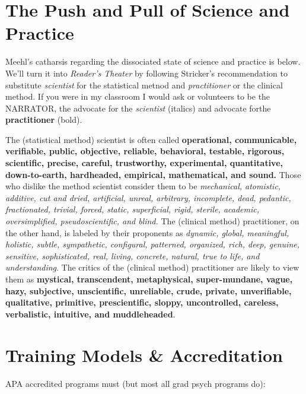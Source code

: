 \documentclass[
  english,
]{book}
\begin{document}
\hypertarget{the-push-and-pull-of-science-and-practice}{%
\section{The Push and Pull of Science and Practice}\label{the-push-and-pull-of-science-and-practice}}

Meehl's \citeyearpar[p.~4]{meehl_clinical_1954} catharsis regarding the dissociated state of science and practice is below. We'll turn it into \emph{Reader's Theater} by following Stricker's \citeyearpar{stricker_are_1997} recommendation to substitute \emph{scientist} for the statistical metnod and \emph{practitioner} or the clinical method. If you were in my classroom I would ask or volunteers to be the NARRATOR, the advocate for the \emph{scientist} (italics) and advocate forthe \textbf{practitioner} (bold).

The (statistical method) scientist is often called \textbf{operational, communicable, verifiable, public, objective, reliable, behavioral, testable, rigorous, scientific, precise, careful, trustworthy, experimental, quantitative, down-to-earth, hardheaded, empirical, mathematical, and sound.} Those who dislike the method scientist consider them to be \emph{mechanical, atomistic, additive, cut and dried, artificial, unreal, arbitrary, incomplete, dead, pedantic, fractionated, trivial, forced, static, superficial, rigid, sterile, academic, oversimplified, pseudoscientific, and blind.} The (clinical method) practitioner, on the other hand, is labeled by their proponents as \emph{dynamic, global, meaningful, holistic, subtle, sympathetic, configural, patterned, organized, rich, deep, genuine, sensitive, sophisticated, real, living, concrete, natural, true to life, and understanding}. The critics of the (clinical method) practitioner are likely to view them as \textbf{mystical, transcendent, metaphysical, super-mundane, vague, hazy, subjective, unscientific, unreliable, crude, private, unverifiable, qualitative, primitive, prescientific, sloppy, uncontrolled, careless, verbalistic, intuitive, and muddleheaded}.

\hypertarget{training-models-accreditation}{%
\section{Training Models \& Accreditation}\label{training-models-accreditation}}

APA accredited programs must (but most all grad psych programs do):
\end{document}
